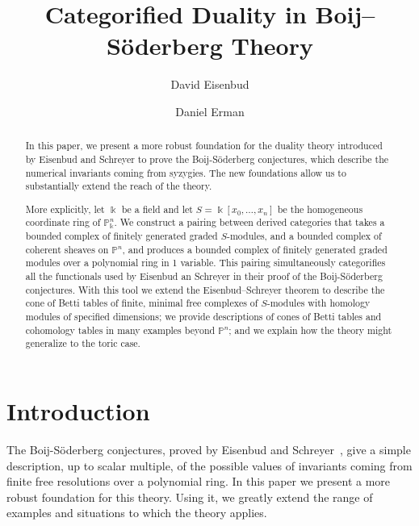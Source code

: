 \documentclass[12pt]{amsart}
\title{Categorified Duality in Boij--S\"oderberg Theory}
\author{David Eisenbud}
\author{Daniel Erman}\thanks{The first author was partially supported by an NSF grant, and the second author was partially supported by an NSF fellowship and by a Simons Foundation fellowship.}
\theoremstyle{definition}
\theoremstyle{remark}
\newcommand{\kk}{\Bbbk}
\newcommand{\PP}{\mathbb{P}}
\renewcommand{\P}{{\mathbb P}}
\begin{document}
\maketitle



\begin{abstract} In this paper, we present a more robust foundation for the duality theory introduced by Eisenbud and Schreyer to prove the Boij-S\"oderberg conjectures, which describe the numerical invariants coming from syzygies. The new foundations allow us to substantially extend the reach of the theory.

More explicitly, let $\kk$ be a field and let $S = \kk[x_{0}, \dots,x_{n}]$ be the homogeneous coordinate ring of $\PP^{n}_{\kk}$.
We construct a pairing between derived categories that takes a bounded complex of
finitely generated graded $S$-modules,  and a bounded complex of coherent sheaves on $\P^{n}$, and produces a bounded complex of finitely generated graded modules over a polynomial ring in 1 variable. This pairing simultaneously categorifies all the functionals used by Eisenbud an Schreyer in their proof of the Boij-S\"oderberg conjectures. With this tool we extend the Eisenbud--Schreyer theorem to describe the cone of Betti tables of finite, minimal free complexes of $S$-modules with homology modules of specified dimensions;  we provide descriptions of cones of Betti tables and cohomology tables in many examples beyond $\PP^n$; and we explain how the theory might generalize to the toric case.
\end{abstract}

\tableofcontents

\section*{Introduction}
The Boij-S\"oderberg conjectures, proved by Eisenbud and Schreyer~\cite{eis-schrey1}, give a simple description, up to scalar multiple, of the possible values of invariants coming from finite free resolutions over a polynomial ring. In this paper we present a more robust foundation for this theory. Using it, we greatly extend the range of examples and situations to which the theory applies.
\end{document}
